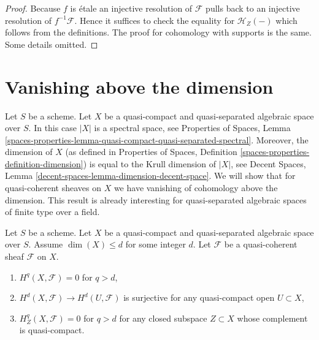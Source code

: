 \begin{proof}
Because $f$ is \'etale an injective resolution of $\mathcal{F}$
pulls back to an injective resolution of $f^{-1}\mathcal{F}$.
Hence it suffices to check the equality for $\mathcal{H}_Z(-)$
which follows from the definitions. The proof for cohomology with
supports is the same. Some details omitted.
\end{proof}






\section{Vanishing above the dimension}
\label{section-vanishing-above-dimension}

\noindent
Let $S$ be a scheme. Let $X$ be a quasi-compact and quasi-separated
algebraic space over $S$. In this case $|X|$ is a spectral space, see
Properties of Spaces, Lemma
\ref{spaces-properties-lemma-quasi-compact-quasi-separated-spectral}.
Moreover, the dimension of $X$ (as defined in
Properties of Spaces, Definition \ref{spaces-properties-definition-dimension})
is equal to the Krull dimension of $|X|$, see
Decent Spaces, Lemma \ref{decent-spaces-lemma-dimension-decent-space}.
We will show that for quasi-coherent sheaves on $X$ we have vanishing of
cohomology above the dimension. This result is already interesting for
quasi-separated algebraic spaces of finite type over a field.

\begin{lemma}
\label{lemma-vanishing-above-dimension}
Let $S$ be a scheme. Let $X$ be a quasi-compact and quasi-separated
algebraic space over $S$. Assume $\dim(X) \leq d$ for some integer $d$.
Let $\mathcal{F}$ be a quasi-coherent sheaf $\mathcal{F}$ on $X$.
\begin{enumerate}
\item $H^q(X, \mathcal{F}) = 0$ for $q > d$,
\item $H^d(X, \mathcal{F}) \to H^d(U, \mathcal{F})$ is surjective
for any quasi-compact open $U \subset X$,
\item $H^q_Z(X, \mathcal{F}) = 0$ for $q > d$ for any closed subspace
$Z \subset X$ whose complement is quasi-compact.
\end{enumerate}
\end{lemma}

